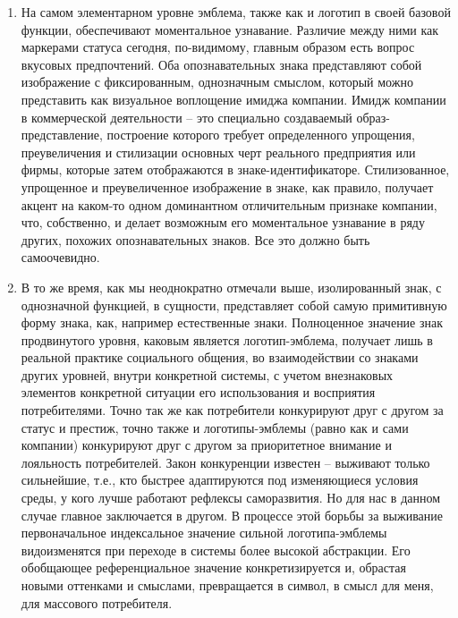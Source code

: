 \begin{enumerate}
\item На самом элементарном уровне эмблема, также как и логотип в
  своей базовой функции, обеспечивают моментальное узнавание. Различие
  между ними как маркерами статуса сегодня, по-видимому, главным образом
  есть вопрос вкусовых предпочтений. Оба опознавательных знака представляют
  собой изображение с фиксированным, однозначным смыслом, который можно представить
  как визуальное воплощение имиджа компании. Имидж компании  в коммерческой
  деятельности -- это специально создаваемый образ-представление, построение
  которого требует определенного упрощения, преувеличения и стилизации основных
  черт реального предприятия или фирмы, которые затем отображаются в знаке-идентификаторе.
  Стилизованное, упрощенное и преувеличенное изображение в знаке, как правило, получает
  акцент на каком-то одном доминантном отличительным признаке компании, что, собственно,
  и делает возможным его моментальное узнавание в ряду других, похожих опознавательных
  знаков\autocites{raigorodski2001}{melnik2001}[][88-99]{karasik2011}. Все это должно быть самоочевидно.
\item В то же время, как мы неоднократно отмечали выше, изолированный знак, с
  однозначной функцией, в сущности, представляет собой самую примитивную форму знака,
  как, например естественные знаки. Полноценное значение знак продвинутого уровня,
  каковым является логотип-эмблема, получает лишь в реальной практике социального общения,
  во взаимодействии со знаками других уровней, внутри конкретной системы,
  с учетом внезнаковых элементов конкретной ситуации его использования и восприятия
  потребителями. Точно так же как потребители конкурируют друг с другом за статус
  и престиж, точно также и логотипы-эмблемы (равно как и сами компании) конкурируют
  друг с другом за приоритетное внимание и лояльность потребителей. Закон конкуренции
  известен -- выживают только сильнейшие, т.е., кто быстрее адаптируются под
  изменяющиеся условия среды, у кого лучше работают рефлексы саморазвития\autocite{simonov1987}.
  Но для нас в данном случае главное заключается в другом. В процессе этой борьбы
  за выживание первоначальное индексальное значение сильной логотипа-эмблемы
  видоизменятся при переходе в системы более высокой абстракции. Его обобщающее
  референциальное значение конкретизируется и, обрастая новыми оттенками и смыслами,
  превращается в символ, в смысл для меня, для массового потребителя.
\end{enumerate}

